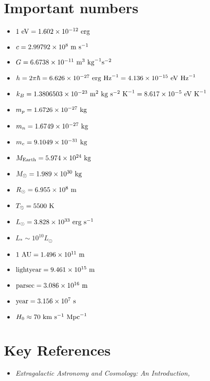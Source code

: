 \section{Important numbers}

\begin{itemize}
\item $1 {\rm ~eV} = 1.602 \times 10^{-12} {\rm ~erg}$
\item $c = 2.99792 \times 10^8  {\rm ~m} {\rm ~s}^{-1} $
\item $G = 6.6738 \times 10^{-11} {\rm ~m}^3 {\rm ~kg}^{-1} {\rm s}^{-2} $
\item $h = 2\pi \hbar = 6.626 \times 10^{-27} {\rm ~erg} {\rm ~Hz}^{-1} =
4.136 \times 10^{-15} {\rm ~eV} {\rm ~Hz}^{-1}$
\item $k_B = 1.3806503 \times 10^{-23} {\rm ~m}^2 {\rm ~kg} {\rm
~s}^{-2} {\rm ~K}^{-1} = 8.617 \times 10^{-5} {\rm ~eV} {\rm ~K}^{-1}$
\item $m_p =  1.6726 \times 10^{-27} {\rm ~kg} $
\item $m_n =  1.6749 \times 10^{-27} {\rm ~kg} $
\item $m_e =  9.1049 \times 10^{-31} {\rm ~kg} $
\item $M_{\rm Earth} = 5.974 \times 10^{24} {\rm ~kg} $
\item $M_{\odot} = 1.989 \times 10^{30} {\rm ~kg} $
\item $R_{\odot} = 6.955 \times 10^{8} {\rm ~m} $
\item $T_{\odot} = 5500 {\rm ~K} $
\item $L_{\odot} = 3.828 \times 10^{33} {\rm ~erg} {\rm ~s}^{-1}$
\item $L_{\ast} \sim 10^{10} L_{\odot} $
\item ${\rm 1~AU} = 1.496 \times 10^{11} {\rm ~m} $
\item ${\rm lightyear} = 9.461 \times 10^{15} {\rm ~m} $
\item ${\rm parsec} = 3.086 \times 10^{16} {\rm ~m} $
\item ${\rm year} = 3.156 \times 10^{7} {\rm ~s} $
\item $H_0 \approx 70 {\rm ~km} {\rm ~s}^{-1} {\rm ~Mpc}^{-1}$     
\end{itemize}

\section{Key References}

\begin{itemize}
  \item {\it Extragalactic Astronomy and Cosmology: An Introduction,
    \citet{schneider15a}}
\end{itemize}


